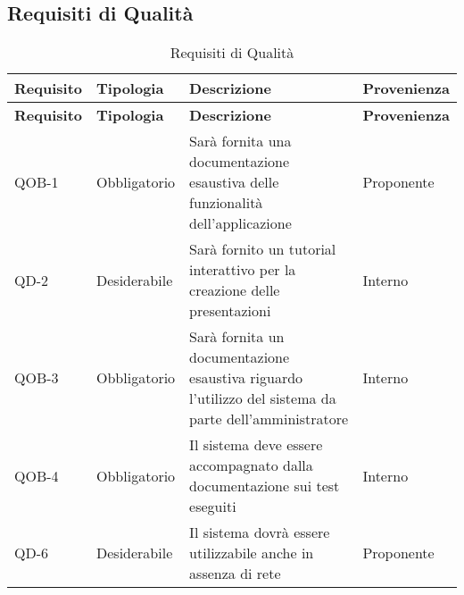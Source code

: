 \subsection{Requisiti di Qualità}{
		\renewcommand*{\arraystretch}{1.4}
		\begin{longtable} [c]{| p{2.5cm} | p{2.5cm} | p{6cm} |p{2.5cm}|}
			\caption{Requisiti di Qualità \label{tab:reqQualita}}\\
			 \hline
			 \textbf{Requisito} & \textbf{Tipologia} & \textbf{Descrizione} & \textbf{Provenienza} \\
			 \hline
			 \endfirsthead
			 \hline
			 \textbf{Requisito} & \textbf{Tipologia} & \textbf{Descrizione} & \textbf{Provenienza} \\
			 \hline
				\endhead
			 \hline
			 \endfoot
			 \hline
			 \endlastfoot
			QOB-1 & Obbligatorio & Sarà fornita una documentazione esaustiva delle funzionalità dell'applicazione & Proponente\\
			\hline
			QD-2 & Desiderabile & Sarà fornito un tutorial interattivo per la creazione delle presentazioni & Interno\\
			\hline
			QOB-3 & Obbligatorio & Sarà fornita un documentazione esaustiva riguardo l'utilizzo del sistema da parte dell'amministratore & Interno\\
			\hline
			QOB-4 & Obbligatorio & Il sistema deve essere accompagnato dalla documentazione sui test eseguiti & Interno\\
			\hline
			QD-6 & Desiderabile & Il sistema dovrà essere utilizzabile anche in assenza di rete & Proponente\\
		\end{longtable}
	}